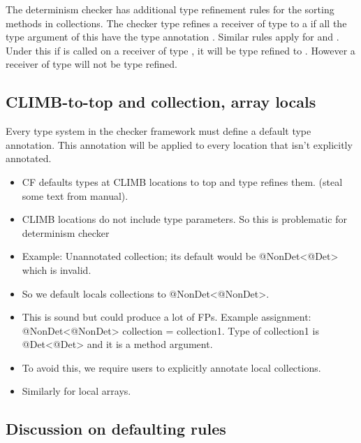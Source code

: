 The determinism checker has additional type refinement rules for the sorting methods in collections. 
The checker type refines a receiver of type  to a  if all the
type argument of this  have the type annotation . Similar rules apply for  and
.
Under this if  is called on a receiver of type , it will
be type refined to . However a receiver of type  will not be type refined.

\subsection{CLIMB-to-top and collection, array locals}

Every type system in the checker framework must define a default type annotation. This annotation will be applied
to every location that isn't explicitly annotated.

\begin{itemize}
	\item CF defaults types at CLIMB locations to top and type refines them. (steal some text from manual).
	\item CLIMB locations do not include type parameters. So this is problematic for determinism checker
	\item Example: Unannotated collection; its default would be @NonDet<@Det> which is invalid.
	\item So we default locals collections to @NonDet<@NonDet>. 
	\item This is sound but could produce a lot of FPs. Example assignment: @NonDet<@NonDet> collection = collection1.
	Type of collection1 is @Det<@Det> and it is a method argument.
	\item To avoid this, we require users to explicitly annotate local collections.
	\item Similarly for local arrays.
\end{itemize}

\subsection{Discussion on defaulting rules}

